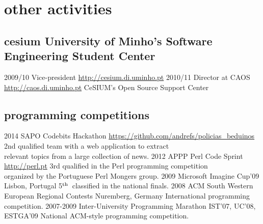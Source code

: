 \documentclass[a4paper]{friggeri-cv}
\begin{document}
\section{other activities}
\subsection{cesium {\normalfont\small University of Minho's Software Engineering Student Center}}{}
\begin{entrylist}
  \entry
    {2009/10}
    {Vice-president}
    {\href{http://cesium.di.uminho.pt}{http://cesium.di.uminho.pt}}
    {\vspace{-.8cm}}
    {}
  \entry
    {2010/11}
    {Director at CAOS}
    {\href{http://caos.di.uminho.pt}{http://caos.di.uminho.pt}}
    {CeSIUM's Open Source Support Center}
    {\vspace{-.5cm}}
\end{entrylist}

\subsection{programming competitions}{}
\begin{entrylist}
  \entry
    {2014}
    {SAPO Codebits Hackathon}
    {\href{https://github.com/andrefs/policias\_beduinos}{https://github.com/andrefs/policias\_beduinos}}
    {2nd qualified team with a web application to extract\\
    relevant topics from a large collection of news.}
    {\vspace{-.4cm}}
  \entry
    {2012}
    {APPP Perl Code Sprint}
    {\href{http://perl.pt}{http://perl.pt}}
    {3rd qualified in the Perl programming competition\\organized by the Portuguese Perl Mongers group.}
    {\vspace{-.4cm}}
  \entry
    {2009}
    {Microsoft Imagine Cup'09}
    {Lisbon, Portugal}
    {5$^{\footnotesize\textrm{th}}$~classified in the national finals.}
    {\vspace{-.4cm}}
  \entry
    {2008}
    {ACM South Western European Regional Contests}
    {Nuremberg, Germany}
    {International programming competition.}
    {\vspace{-.4cm}}
  \entry
    {2007-2009}
    {Inter-University Programming Marathon}
    {IST'07, UC'08, ESTGA'09}
    {National ACM-style programming competition.}
    {\vspace{-.4cm}}
\end{entrylist}
\end{document}
